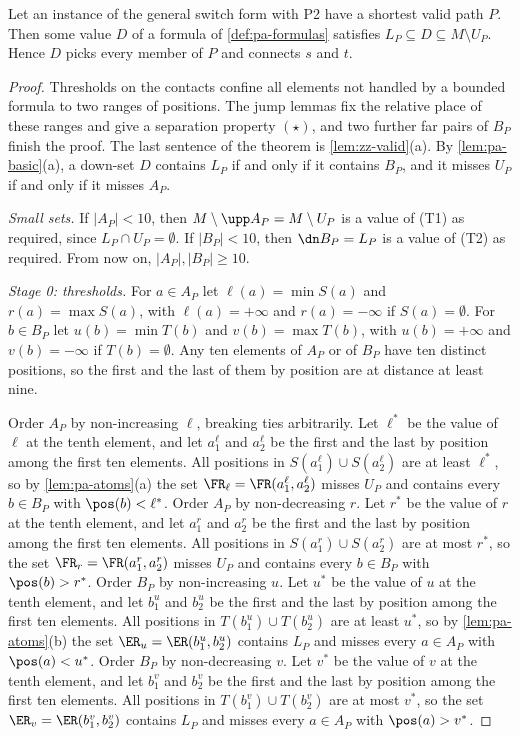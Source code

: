 \begin{theorem}
\label{thm:pa-formulas}
Let an instance of the general switch form with P2 have a shortest valid path $P$.
Then some value $D$ of a formula of \cref{def:pa-formulas} satisfies $L_P \subseteq D \subseteq M \setminus U_P$.
Hence $D$ picks every member of $P$ and connects $s$ and $t$.
\end{theorem}

\begin{proof}
Thresholds on the contacts confine all elements not handled by a bounded formula to two ranges of positions.
The jump lemmas fix the relative place of these ranges and give a separation property $(\star)$, and two further far pairs of $B_P$ finish the proof.
The last sentence of the theorem is \cref{lem:zz-valid}(a).
By \cref{lem:pa-basic}(a), a down-set $D$ contains $L_P$ if and only if it contains $B_P$, and it misses $U_P$ if and only if it misses $A_P$.

\emph{Small sets.}
If $|A_P| < 10$, then $M \setminus \upp A_P = M \setminus U_P$ is a value of (T1) as required, since $L_P \cap U_P = \emptyset$.
If $|B_P| < 10$, then $\dn B_P = L_P$ is a value of (T2) as required.
From now on, $|A_P|, |B_P| \geq 10$.

\emph{Stage 0: thresholds.}
For $a \in A_P$ let $\ell(a) = \min S(a)$ and $r(a) = \max S(a)$, with $\ell(a) = +\infty$ and $r(a) = -\infty$ if $S(a) = \emptyset$.
For $b \in B_P$ let $u(b) = \min T(b)$ and $v(b) = \max T(b)$, with $u(b) = +\infty$ and $v(b) = -\infty$ if $T(b) = \emptyset$.
Any ten elements of $A_P$ or of $B_P$ have ten distinct positions, so the first and the last of them by position are at distance at least nine.

Order $A_P$ by non-increasing $\ell$, breaking ties arbitrarily.
Let $\ell^*$ be the value of $\ell$ at the tenth element, and let $a^\ell_1$ and $a^\ell_2$ be the first and the last by position among the first ten elements.
All positions in $S(a^\ell_1) \cup S(a^\ell_2)$ are at least $\ell^*$, so by \cref{lem:pa-atoms}(a) the set $\FR_\ell = \FR(a^\ell_1, a^\ell_2)$ misses $U_P$ and contains every $b \in B_P$ with $\pos(b) < \ell^*$.
Order $A_P$ by non-decreasing $r$.
Let $r^*$ be the value of $r$ at the tenth element, and let $a^r_1$ and $a^r_2$ be the first and the last by position among the first ten elements.
All positions in $S(a^r_1) \cup S(a^r_2)$ are at most $r^*$, so the set $\FR_r = \FR(a^r_1, a^r_2)$ misses $U_P$ and contains every $b \in B_P$ with $\pos(b) > r^*$.
Order $B_P$ by non-increasing $u$.
Let $u^*$ be the value of $u$ at the tenth element, and let $b^u_1$ and $b^u_2$ be the first and the last by position among the first ten elements.
All positions in $T(b^u_1) \cup T(b^u_2)$ are at least $u^*$, so by \cref{lem:pa-atoms}(b) the set $\ER_u = \ER(b^u_1, b^u_2)$ contains $L_P$ and misses every $a \in A_P$ with $\pos(a) < u^*$.
Order $B_P$ by non-decreasing $v$.
Let $v^*$ be the value of $v$ at the tenth element, and let $b^v_1$ and $b^v_2$ be the first and the last by position among the first ten elements.
All positions in $T(b^v_1) \cup T(b^v_2)$ are at most $v^*$, so the set $\ER_v = \ER(b^v_1, b^v_2)$ contains $L_P$ and misses every $a \in A_P$ with $\pos(a) > v^*$.


\end{proof}
